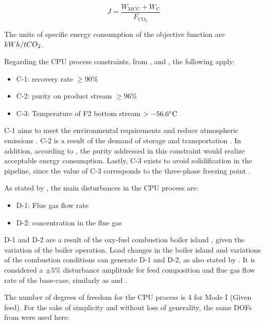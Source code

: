 \documentclass[../../msc-thesis.tex]{subfiles}
\begin{document}
\begin{equation}
    J=\frac{W_{\mathrm{MCC}}+W_{\mathrm{C}}}{F_{\mathrm{CO}_{2}}}
    \label{eq:eq1}
\end{equation}

The units of specific energy consumption of the objective function are 
$kWh/{tCO\textsubscript{2}}$.

Regarding the CPU process constraints, from \textcite{Jin2015},
\textcite{Liu2019} and \textcite{Dillon2005}, the following apply:

\begin{itemize}
    \item C-1: \co recovery rate $\geq 90 \%$
    \item C-2: \co purity on product stream  $\geq 96 \%$
    \item C-3: Temperature of F2 bottom stream $>-56.6\celsius$
\end{itemize}

C-1 aims to meet the environmental requirements \cite{Liu2019} and reduce 
\co atmospheric emissions \cite{Toftegaard2010, Buhre2005}. 
C-2 is a result of the demand of \co storage and transportation 
\cite{Liu2019}. In addition, according to \textcite{Posch2012}, the purity 
addressed in this constraint would realize acceptable energy consumption. 
Lastly, C-3 exists to avoid \co solidification in the pipeline, since the 
value of C-3 corresponds to the \co three-phase freezing point 
\cite{Posch2012, Koohestanian2017}.

As stated by \textcite{Liu2019}, the main disturbances in the CPU process are:

\begin{itemize}
    \item D-1: Flue gas flow rate
    \item D-2: \co concentration in the flue gas
\end{itemize}

D-1 and D-2 are a result of the oxy-fuel combustion boiler island 
\cite{Liu2019}, given the variation of the boiler operation. Load changes 
in the boiler island and variations of the combustion conditions can 
generate D-1 and D-2, as also stated by \textcite{Liu2019}. It is considered 
a $\pm 5 \%$ disturbance amplitude for \co feed composition and flue gas 
flow rate of the base-case, similarly as \textcite{Jin2015} and 
\textcite{Liu2019}.

The number of degrees of freedom for the CPU process is 4 \cite{Jin2015, 
Liu2019} for Mode I (Given feed). For the sake of simplicity and without 
loss of generality, the same DOFs from \textcite{Jin2015} were used here:
\end{document}
